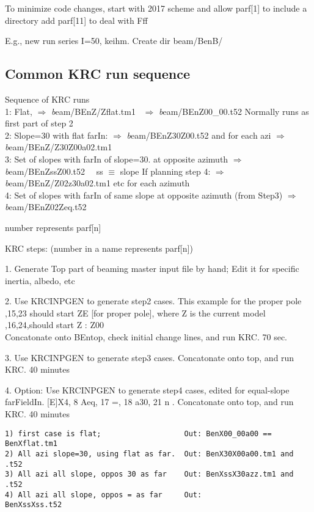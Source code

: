 \documentclass{article}
\newcommand{\qfo}[1]{$\Longrightarrow$ \textit{#1}} %
\begin{document}
To minimize code changes, start with 2017 scheme and 
\qi allow parf[1] to include a directory
\qi add parf[11] to deal with Fff

E.g., new run series I=50, keihm. Create dir beam/BenB/  

\subsection{Common KRC run sequence \label{krcseq}}
 Sequence of KRC runs
\\ 1: Flat, \qfo beam/BEnZ/Zflat.tm1 \ \qfo beam/BEnZ00_00.t52 
\qi  Normally runs as first part of step 2
\\ 2: Slope=30 with flat farIn: \qfo beam/BEnZ30Z00.t52  
\qi  and for each azi \qfo beam/BEnZ/Z30Z00a02.tm1
\\ 3: Set of slopes with farIn of slope=30. at opposite azimuth
\qi   \qfo beam/BEnZssZ00.t52 \ \ ss $\equiv$ slope
\qi If planning step 4: \qfo beam/BEnZ/Z02z30a02.tm1 etc for each azimuth
\\ 4: Set of slopes with farIn of same slope at opposite azimuth (from Step3)
\qi   \qfo beam/BEnZ02Zeq.t52


number represents parf[n]

KRC steps: (number in a name represents parf[n])

1. Generate Top part of beaming master input file by hand;
\qi  Edit it for specific inertia, albedo, etc

2. Use KRCINPGEN to generate step2 cases. This example for the proper pole
,15,23 should start ZE [for proper pole], where Z is the current model
,16,24,should start Z 
:  Z00 
\\ Concatonate onto BEntop, check initial change lines,  and run KRC.  70 sec.

3. Use KRCINPGEN to generate step3 cases. Concatonate onto top, and run KRC. 40 minutes 

4. Option:  Use KRCINPGEN to generate step4 cases, edited for equal-slope farFieldIn. 
 [E]X4,  8 Aeq, 17 =, 18 a30, 21 n . Concatonate onto top, and run KRC. 40 minutes 

\vspace{-3.mm} 
\begin{verbatim}
1) first case is flat;                   Out: BenX00_00a00 == BenXflat.tm1
2) All azi slope=30, using flat as far.  Out: BenX30X00a00.tm1 and .t52
3) All azi all slope, oppos 30 as far    Out: BenXssX30azz.tm1 and .t52
4) All azi all slope, oppos = as far     Out:             BenXssXss.t52
\end{verbatim}
  
\end{document}
